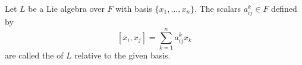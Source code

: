 Let $L$ be a Lie algebra over $F$ with basis $\{x_1, \ldots, x_n\}$. The scalars $a_{ij}^k \in F$ defined by
$$[x_i, x_j] = \sum_{k=1}^{n} a_{ij}^{k} x_k$$
are called the  of $L$ relative to the given basis.
